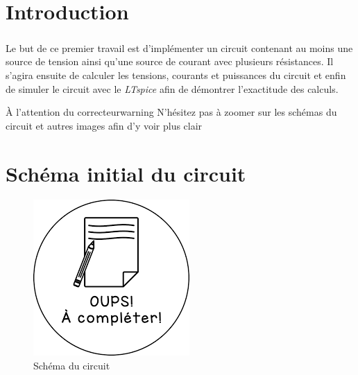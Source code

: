 \section{Introduction}

    \subparagraph{}Le but de ce {\color{info}premier travail} est d'implémenter un circuit contenant au moins une source de tension ainsi qu'une source de courant avec 
    plusieurs résistances. Il s'agira ensuite de calculer les tensions, courants et puissances du circuit et enfin de simuler le circuit avec le \textit{LTspice}
    afin de démontrer l'exactitude des calculs.\\[1.5cm]
    
    \begin{titletbox}{À l'attention du correcteur}{warning}
        N'hésitez pas à zoomer sur les schémas du circuit et autres images afin d'y voir plus clair
    \end{titletbox}

\section{Schéma initial du circuit}

    \begin{figure}[H]
        \centering
        \includegraphics[scale=0.5]{../pictures/blank.png} %
        \caption{Schéma du circuit}
    \end{figure}

